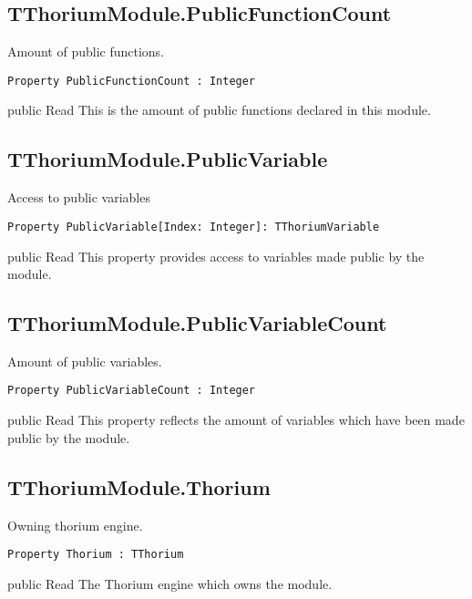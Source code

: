 \subsection{TThoriumModule.PublicFunctionCount}
\label{thoriumcorepkg:thorium:tthoriummodule:publicfunctioncount}
\begin{FPCList}
\Synopsis
Amount of public functions.\Declaration 

\begin{verbatim}
Property PublicFunctionCount : Integer
\end{verbatim}
\Visibility
public
\Access
Read
\Description
This is the amount of public functions declared in this module.\end{FPCList}
\subsection{TThoriumModule.PublicVariable}
\label{thoriumcorepkg:thorium:tthoriummodule:publicvariable}
\begin{FPCList}
\Synopsis
Access to public variables\Declaration 

\begin{verbatim}
Property PublicVariable[Index: Integer]: TThoriumVariable
\end{verbatim}
\Visibility
public
\Access
Read
\Description
This property provides access to variables made public by the module.\end{FPCList}
\subsection{TThoriumModule.PublicVariableCount}
\label{thoriumcorepkg:thorium:tthoriummodule:publicvariablecount}
\begin{FPCList}
\Synopsis
Amount of public variables.\Declaration 

\begin{verbatim}
Property PublicVariableCount : Integer
\end{verbatim}
\Visibility
public
\Access
Read
\Description
This property reflects the amount of variables which have been made public by the module.\end{FPCList}
\subsection{TThoriumModule.Thorium}
\label{thoriumcorepkg:thorium:tthoriummodule:thorium}
\begin{FPCList}
\Synopsis
Owning thorium engine.\Declaration 

\begin{verbatim}
Property Thorium : TThorium
\end{verbatim}
\Visibility
public
\Access
Read
\Description
The Thorium engine which owns the module.\end{FPCList}
